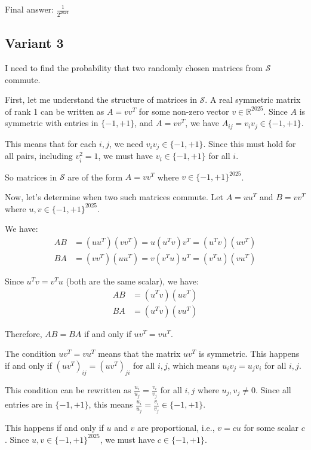 \documentclass[12pt,a4paper]{article}
\theoremstyle{definition}
\begin{document}
    Final answer: $\frac{1}{2^{2024}}$
\subsection{Variant 3}
    I need to find the probability that two randomly chosen matrices from $\mathcal{S}$ commute.

    First, let me understand the structure of matrices in $\mathcal{S}$. A real symmetric matrix of rank 1 can be written as $A = vv^T$ for some non-zero vector $v \in \mathbb{R}^{2025}$. Since $A$ is symmetric with entries in $\{-1, +1\}$, and $A = vv^T$, we have $A_{ij} = v_i v_j \in \{-1, +1\}$.

    This means that for each $i,j$, we need $v_i v_j \in \{-1, +1\}$. Since this must hold for all pairs, including $v_i^2 = 1$, we must have $v_i \in \{-1, +1\}$ for all $i$.

    So matrices in $\mathcal{S}$ are of the form $A = vv^T$ where $v \in \{-1, +1\}^{2025}$.

    Now, let's determine when two such matrices commute. Let $A = uu^T$ and $B = vv^T$ where $u, v \in \{-1, +1\}^{2025}$.

    We have:
    \begin{align}
        AB &= (uu^T)(vv^T) = u(u^T v)v^T = (u^T v)(uv^T) \\
        BA &= (vv^T)(uu^T) = v(v^T u)u^T = (v^T u)(vu^T)
    \end{align}

    Since $u^T v = v^T u$ (both are the same scalar), we have:
    \begin{align}
        AB &= (u^T v)(uv^T) \\
        BA &= (u^T v)(vu^T)
    \end{align}

    Therefore, $AB = BA$ if and only if $uv^T = vu^T$.

    The condition $uv^T = vu^T$ means that the matrix $uv^T$ is symmetric. This happens if and only if $(uv^T)_{ij} = (uv^T)_{ji}$ for all $i,j$, which means $u_i v_j = u_j v_i$ for all $i,j$.

    This condition can be rewritten as $\frac{u_i}{u_j} = \frac{v_i}{v_j}$ for all $i,j$ where $u_j, v_j \neq 0$. Since all entries are in $\{-1, +1\}$, this means $\frac{u_i}{u_j} = \frac{v_i}{v_j} \in \{-1, +1\}$.

    This happens if and only if $u$ and $v$ are proportional, i.e., $v = cu$ for some scalar $c$. Since $u, v \in \{-1, +1\}^{2025}$, we must have $c \in \{-1, +1\}$.
\end{document}
